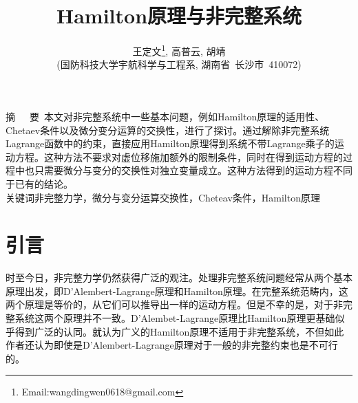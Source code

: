 \documentclass[a4paper,UTF8,11pt,hyperref]{ctexart}
\title{\huge{Hamilton原理与非完整系统}}
\author{王定文\footnote{Email:wangdingwen0618@gmail.com}, 高普云, 胡靖\\[2pt]
\normalsize
(国防科技大学宇航科学与工程系, 湖南省~长沙市~410072)}
\date{}
\begin{document}
\newcommand{\supercite}[1]{\textsuperscript{\cite{#1}}}
\maketitle
\setlength{\oddsidemargin}{ 1cm}  %
\setlength{\evensidemargin}{\oddsidemargin}
\setlength{\textwidth}{13.50cm}
\vspace{-.8cm}
\begin{center}
\parbox{\textwidth}{
\heiti 摘~~~要\quad \kaishu~本文对非完整系统中一些基本问题，例如Hamilton原理的适用性、Chetaev条件以及微分变分运算的交换性，进行了探讨。通过解除非完整系统Lagrange函数中的约束，直接应用Hamilton原理得到系统不带Lagrange乘子的运动方程。这种方法不要求对虚位移施加额外的限制条件，同时在得到运动方程的过程中也只需要微分与变分的交换性对独立变量成立。这种方法得到的运动方程不同于已有的结论。\\
\heiti 关键词\quad\kaishu 非完整力学，微分与变分运算交换性，Cheteav条件，Hamilton原理}
\end{center}

\setlength{\oddsidemargin}{-.5cm}  %
\setlength{\evensidemargin}{\oddsidemargin}
\setlength{\textwidth}{17.00cm}
\songti

\section{引言}\label{sec:intro}
时至今日，非完整力学仍然获得广泛的观注\supercite{borisov2002,cronstrom2009,flannery2005,Flannery201102,Flannery2011,Gao2005}。处理非完整系统问题经常从两个基本原理出发，即D'Alembert-Lagrange原理和Hamilton原理。在完整系统范畴内，这两个原理是等价的，从它们可以推导出一样的运动方程。但是不幸的是，对于非完整系统这两个原理并不一致\supercite{cronstrom2009,flannery2005}。D'Alembet-Lagrange原理比Hamilton原理更基础似乎得到广泛的认同\supercite{flannery2005}。\cite{flannery2005}就认为广义的Hamilton原理不适用于非完整系统，不但如此作者还认为即使是D'Alembert-Lagrange原理对于一般的非完整约束也是不可行的。
\end{document}
